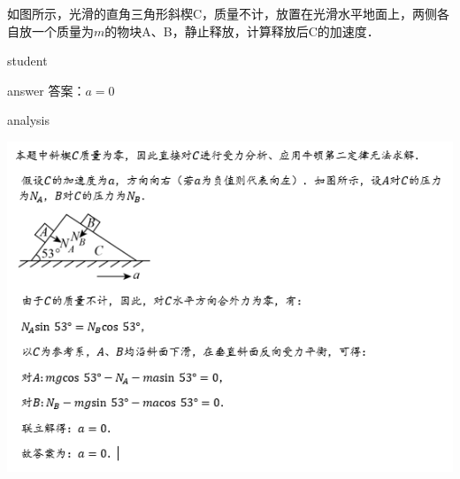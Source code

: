 \begin{example}
	如图所示，光滑的直角三角形斜楔C，质量不计，放置在光滑水平地面上，两侧各自放一个质量为$ m $的物块A、B，静止释放，计算释放后C的加速度．
	
	\begin{taggedblock}{student}
		\vspace*{2cm}
	\end{taggedblock}
	
	
	\begin{taggedblock}{answer}
		答案：$ a=0 $
	\end{taggedblock}
	
	
	\begin{taggedblock}{analysis}
				\begin{center}
					\includegraphics[width=0.9\linewidth]{image/NIR-16}
				\end{center}
	\end{taggedblock}
\end{example}